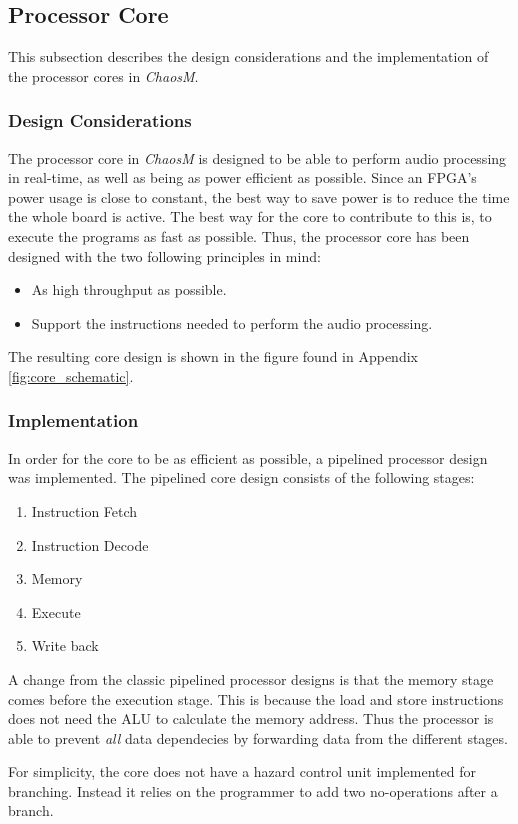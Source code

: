 
\FloatBarrier
\subsection{Processor Core}\label{subsec:fpga-processor-core}

This subsection describes the design considerations and the implementation of the
 processor cores in \textit{ChaosM}.

\subsubsection{Design Considerations}

The processor core in \textit{ChaosM} is designed to be able to perform audio processing in real-time, as well as being as power efficient as possible.
Since an FPGA's power usage is close to constant, the best way to save power is to reduce the time the whole board is active.
The best way for the core to contribute to this is, to execute the programs as fast as possible.
Thus, the processor core has been designed with the two following principles in mind:

\begin{itemize}
	\item As high throughput as possible.
	\item Support the instructions needed to perform the audio processing.
\end{itemize}

The resulting core design is shown in the figure found in Appendix \ref{fig:core_schematic}.

\subsubsection{Implementation}

In order for the core to be as efficient as possible, a pipelined processor
design was implemented. The pipelined core design consists of the following
stages:

\begin{enumerate}
	\item Instruction Fetch \label{stage:if}
	\item Instruction Decode \label{stage:id}
	\item Memory \label{stage:mem}
	\item Execute \label{stage:ex}
	\item Write back \label{stage:wb}
\end{enumerate}

A change from the classic pipelined processor designs is that the memory stage comes before the execution stage.
This is because the load and store instructions does not need the ALU to calculate the memory address.
Thus the processor is able to prevent \textit{all} data dependecies by forwarding data from the different stages.

For simplicity, the core does not have a hazard control unit implemented for branching.
Instead it relies on the programmer to add two no-operations after a branch.


